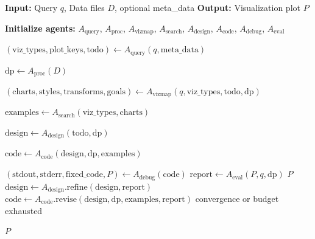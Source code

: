 \begin{algorithm}
\caption{\methodname{} Multi-Agent Visualization Workflow}
\label{algo:workflow}
\begin{algorithmic}[1]
\State \textbf{Input:} Query $q$, Data files $D$, optional meta\_data
\State \textbf{Output:} Visualization plot $P$

\State \textbf{Initialize agents:} 
$A_{\text{query}}$, 
$A_{\text{proc}}$, 
$A_{\text{vizmap}}$, 
$A_{\text{search}}$, 
$A_{\text{design}}$, 
$A_{\text{code}}$, 
$A_{\text{debug}}$, 
$A_{\text{eval}}$

\State $(\text{viz\_types}, \text{plot\_keys}, \text{todo}) \gets A_{\text{query}}(q, \text{meta\_data})$

\State $\text{dp} \gets A_{\text{proc}}(D)$

\State $(\text{charts}, \text{styles}, \text{transforms}, \text{goals}) \gets 
A_{\text{vizmap}}(q, \text{viz\_types}, \text{todo}, \text{dp})$

\State $\text{examples} \gets A_{\text{search}}(\text{viz\_types}, \text{charts})$

\State $\text{design} \gets A_{\text{design}}(\text{todo}, \text{dp})$

\State $\text{code} \gets A_{\text{code}}(\text{design}, \text{dp}, \text{examples})$

\Repeat
    \State $(\text{stdout}, \text{stderr}, \text{fixed\_code}, P) \gets A_{\text{debug}}(\text{code})$
    \State $\text{report} \gets A_{\text{eval}}(P, q, \text{dp})$
        \State \Return $P$
    \Else
        \State $\text{design} \gets A_{\text{design}}.\text{refine}(\text{design}, \text{report})$
        \State $\text{code} \gets A_{\text{code}}.\text{revise}(\text{design}, \text{dp}, \text{examples}, \text{report})$
    \EndIf
\Until convergence or budget exhausted

\State \Return $P$ 
\end{algorithmic}
\end{algorithm}

